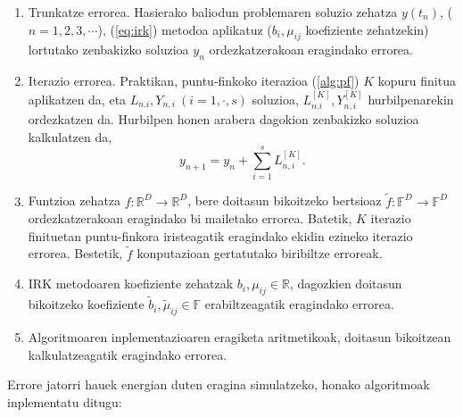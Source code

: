 \begin{enumerate}
\item Trunkatze errorea. Hasierako baliodun problemaren soluzio zehatza $y(t_n)$, ($n=1,2,3,\cdots$), (\ref{eq:irk}) metodoa aplikatuz  ($b_i,\mu_{ij}$ koefiziente zehatzekin) lortutako zenbakizko soluzioa $y_n$ ordezkatzerakoan eragindako errorea. 
\item Iterazio errorea. Praktikan, puntu-finkoko iterazioa (\ref{alg:pf}) $K$ kopuru finitua aplikatzen da, eta $L_{n.i}, Y_{n,i} \ (i=1,\cdot,s)$ soluzioa, $L_{n.i}^{[K]}, Y_{n,i}^{[K]}$ hurbilpenarekin ordezkatzen da. Hurbilpen honen arabera dagokion zenbakizko soluzioa kalkulatzen da,
\begin{equation*}
y_{n+1}=y_{n}+\sum_{i=1}^{s} L_{n,i}^{[K]}.
\end{equation*}   
\item Funtzioa zehatza $f:\mathbb{R}^D \rightarrow \mathbb{R}^D$, bere doitasun bikoitzeko bertsioaz $\tilde{f}:\mathbb{F}^D \rightarrow \mathbb{F}^D$ ordezkatzerakoan eragindako bi mailetako errorea. Batetik, $K$ iterazio finituetan puntu-finkora iristeagatik eragindako ekidin ezineko iterazio errorea. Bestetik, $\tilde{f}$ konputazioan gertatutako biribiltze erroreak. 
\item IRK metodoaren koefiziente zehatzak $b_i,\mu_{ij} \in \mathbb{R}$, dagozkien doitasun bikoitzeko koefiziente $\tilde{b}_i,\tilde{\mu}_{ij} \in \mathbb{F}$ erabiltzeagatik eragindako errorea.
\item Algoritmoaren inplementazioaren eragiketa aritmetikoak, doitasun bikoitzean kalkulatzeagatik eragindako errorea.  
\end{enumerate} 

Errore jatorri hauek energian duten eragina simulatzeko, honako algoritmoak inplementatu ditugu:

